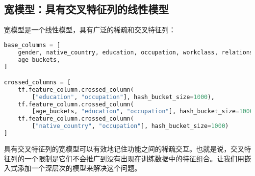 \subsection{宽模型：具有交叉特征列的线性模型}
宽模型是一个线性模型，具有广泛的稀疏和交叉特征列：
\begin{lstlisting}[language=Python]
base_columns = [
    gender, native_country, education, occupation, workclass, relationship,
    age_buckets,
]

crossed_columns = [
    tf.feature_column.crossed_column(
        ["education", "occupation"], hash_bucket_size=1000),
    tf.feature_column.crossed_column(
        [age_buckets, "education", "occupation"], hash_bucket_size=1000),
    tf.feature_column.crossed_column(
        ["native_country", "occupation"], hash_bucket_size=1000)
]
\end{lstlisting}
具有交叉特征列的宽模型可以有效地记住功能之间的稀疏交互。也就是说，交叉特征列的一个限制是它们不会推广到没有出现在训练数据中的特征组合。让我们用嵌入式添加一个深层次的模型来解决这个问题。
 
